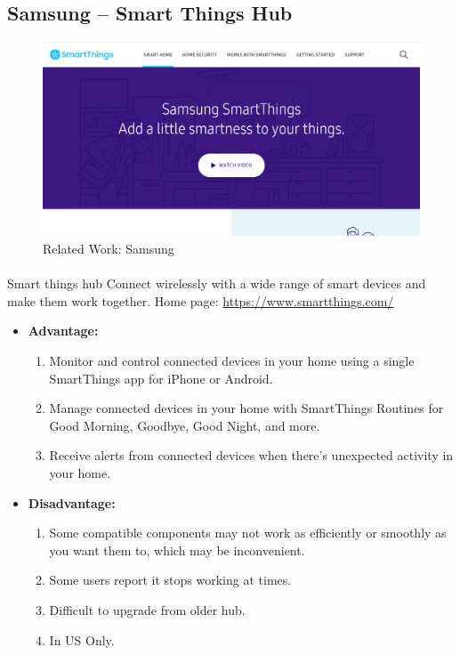 \documentclass[a4paper, 12pt, oneside]{book}
\newcommand\boldcolor[1]{\textcolor{bold}{\textbf{#1}}}
\begin{document}
		\subsection{Samsung – Smart Things Hub}
		\begin{figure}[H]
  			\caption{Related Work: Samsung}
			\includegraphics[width=\linewidth]{img/samsung.png}
		\end{figure}
		\paragraph{}Smart things hub Connect wirelessly with a wide range of smart devices and make them work together.
		Home page: \url{https://www.smartthings.com/}
		\begin{itemize}
			\item \boldcolor{Advantage:}
			\begin{enumerate}
				\item Monitor and control connected devices in your home using a single SmartThings app for iPhone or Android.
				\item Manage connected devices in your home with SmartThings Routines for Good Morning, Goodbye, Good Night, and more.
				\item Receive alerts from connected devices when there’s unexpected activity in your home.
				
			\end{enumerate}
			\item \boldcolor{Disadvantage:} 
			\begin{enumerate}
				\item Some compatible components may not work as efficiently or smoothly as you want them to, which may be inconvenient.
				\item Some users report it stops working at times.
				\item Difficult to upgrade from older hub.
				\item In US Only.
			\end{enumerate}
		\end{itemize}
\end{document}

